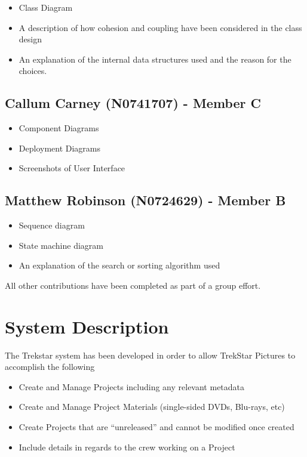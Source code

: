 \documentclass[
  english,
  a4paper,
,tablecaptionabove
]{scrartcl}
\providecommand{\tightlist}{%
  \setlength{\itemsep}{0pt}\setlength{\parskip}{0pt}}
\begin{document}
\begin{itemize}
\tightlist
\item
  Class Diagram
\item
  A description of how cohesion and coupling have been considered in the
  class design
\item
  An explanation of the internal data structures used and the reason for
  the choices.
\end{itemize}

\hypertarget{callum-carney-n0741707---member-c}{%
\subsection{Callum Carney (N0741707) - Member
C}\label{callum-carney-n0741707---member-c}}

\begin{itemize}
\tightlist
\item
  Component Diagrams
\item
  Deployment Diagrams
\item
  Screenshots of User Interface
\end{itemize}

\hypertarget{matthew-robinson-n0724629---member-b}{%
\subsection{Matthew Robinson (N0724629) - Member
B}\label{matthew-robinson-n0724629---member-b}}

\begin{itemize}
\tightlist
\item
  Sequence diagram
\item
  State machine diagram
\item
  An explanation of the search or sorting algorithm used
\end{itemize}

All other contributions have been completed as part of a group effort.

\newpage

\hypertarget{system-description}{%
\section{System Description}\label{system-description}}

The Trekstar system has been developed in order to allow TrekStar
Pictures to accomplish the following

\begin{itemize}
\tightlist
\item
  Create and Manage Projects including any relevant metadata
\item
  Create and Manage Project Materials (single-sided DVDs, Blu-rays, etc)
\item
  Create Projects that are \enquote{unreleased} and cannot be modified
  once created
\item
  Include details in regards to the crew working on a Project
\end{itemize}
\end{document}
